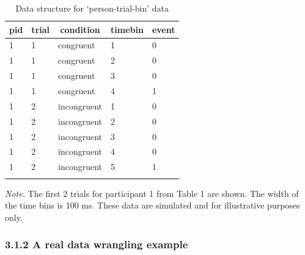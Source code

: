 \documentclass[
  man, donotrepeattitle,floatsintext]{apa6}
\begin{document}
\begin{table}[H]

\begin{center}
\begin{threeparttable}

\caption{\label{tab:ha-data-table}Data structure for `person-trial-bin' data}

\begin{tabular}{lllll}
\toprule
pid & \multicolumn{1}{c}{trial} & \multicolumn{1}{c}{condition} & \multicolumn{1}{c}{timebin} & \multicolumn{1}{c}{event}\\
\midrule
1 & 1 & congruent & 1 & 0\\
1 & 1 & congruent & 2 & 0\\
1 & 1 & congruent & 3 & 0\\
1 & 1 & congruent & 4 & 1\\
1 & 2 & incongruent & 1 & 0\\
1 & 2 & incongruent & 2 & 0\\
1 & 2 & incongruent & 3 & 0\\
1 & 2 & incongruent & 4 & 0\\
1 & 2 & incongruent & 5 & 1\\
\bottomrule
\addlinespace
\end{tabular}

\begin{tablenotes}[para]
\normalsize{\textit{Note.} The first 2 trials for participant 1 from Table 1 are shown. The width of the time bins is 100 ms. These data are simulated and for illustrative purposes only.}
\end{tablenotes}

\end{threeparttable}
\end{center}

\end{table}

\subsubsection{3.1.2 A real data wrangling example}\label{a-real-data-wrangling-example}
\end{document}
